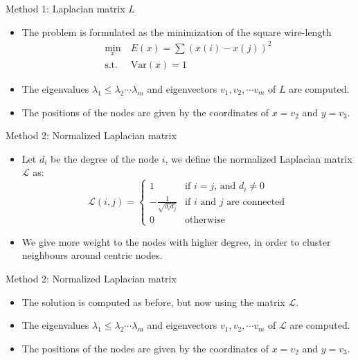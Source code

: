 \documentclass[serif, 12pt]{beamer}
\begin{document}
\begin{frame}{Method 1: Laplacian matrix $L$}


\begin{itemize}

\item The problem is formulated as the minimization of the square wire-length
\begin{equation}
\begin{split}
\min_x \  & E(x) = \sum (x(i) - x(j))^2 \\
\textrm{s.t.} \ & \textrm{Var}(x) = 1
\end{split}
\end{equation}
\item The eigenvalues $\lambda_1 \le \lambda_2 \cdots \lambda_m$ and 
eigenvectors $v_1, v_2, \cdots v_m$ of $L$ are computed.

\item The positions of the nodes are given by the coordinates of $x = v_2$ and 
$y = v_3$.
\end{itemize}

\end{frame}

\begin{frame}{Method 2: Normalized Laplacian matrix}

\begin{itemize}
\item Let $d_i$ be the degree of the node $i$, we define the normalized 
Laplacian matrix $\mathcal{L}$ as:
$$ \mathcal{L}(i,j) =
\begin{cases}
	1 & \text{if $i = j$, and $d_i \neq 0$} \\
	-\frac{1}{\sqrt{d_i d_j}} & \text{if $i$ and $j$ are connected} \\
	0 & \text{otherwise}
\end{cases}
$$

\item We give more weight to the nodes with higher degree, in order to cluster 
neighbours around centric nodes.
\end{itemize}

\end{frame}

\begin{frame}{Method 2: Normalized Laplacian matrix}

\begin{itemize}
\item The solution is computed as before, but now using the matrix 
$\mathcal{L}$.

\item The eigenvalues $\lambda_1 \le \lambda_2 \cdots \lambda_m$ and 
eigenvectors $v_1, v_2, \cdots v_m$ of $\mathcal L$ are computed.

\item The positions of the nodes are given by the coordinates of $x = v_2$ and 
$y = v_3$.
\end{itemize}


\end{frame}
\end{document}
